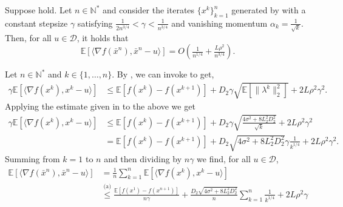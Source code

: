 \begin{lemmarep}\label{lem:frankwolfe_rate}
    Suppose  hold. Let $n\in\mathbb{N}^*$ and consider the iterates $\{x^k\}_{k=1}^n$ generated by  with a constant stepsize $\gamma$ satisfying $\tfrac{1}{2n^{3/4}}<\gamma<\tfrac{1}{n^{3/4}}$ and vanishing momentum $\alpha_k = \frac{1}{\sqrt{k}}$. Then, for all $u\in\mathcal{D}$, it holds that
    \begin{equation*}
        \mathbb{E}[\langle \nabla f(\bar{x}^n), \bar{x}^n-u\rangle] = O\left(\tfrac{1}{n^{1/4}} + \tfrac{L\rho^2}{n^{3/4}}\right).
    \end{equation*}
\end{lemmarep}
\begin{appendixproof}
    Let $n\in\mathbb{N}^*$ and $k\in\{1,\ldots,n\}$. By , we can invoke  to get,
    \begin{equation*}
        \begin{aligned}
            \gamma\mathbb{E}[\langle \nabla f(x^k),x^k-u\rangle]
                &\leq \mathbb{E}[f(x^k) - f(x^{k+1})] + D_2 \gamma \sqrt{\mathbb{E}[\| \lambda^k\|_2^2]} + 2L\rho^2\gamma^2.
        \end{aligned}
    \end{equation*}
    Applying the estimate given in  to the above we get
    \begin{equation*}
        \begin{aligned}
            \gamma\mathbb{E}[\langle \nabla f(x^k),x^k-u\rangle]
                &\leq \mathbb{E}[f(x^k) - f(x^{k+1})] + D_2 \gamma \sqrt{\frac{4\sigma^2+8L_2^2D_2^2}{\sqrt{k}}} + 2L\rho^2\gamma^2\\
                &= \mathbb{E}[f(x^k) - f(x^{k+1})] + D_2 \sqrt{4\sigma^2+8L_2^2D_2^2} \gamma \frac{1}{k^{1/4}} + 2L\rho^2\gamma^2.
        \end{aligned}
    \end{equation*}
    Summing from $k=1$ to $n$ and then dividing by $n\gamma$ we find, for all $u\in\mathcal{D}$,
    \begin{equation*}
        \begin{aligned}
            \mathbb{E}[\langle \nabla f(\bar{x}^n),\bar{x}^n-u\rangle]
                &= \frac{1}{n}\sum\limits_{k=1}^n\mathbb{E}[\langle \nabla f(x^k),x^k-u\rangle]\\
                &\stackrel{\text{(a)}}{\leq} \frac{\mathbb{E}[f(x^1) - f(x^{n+1})]}{n\gamma} + \frac{D_2\sqrt{4\sigma^2+8L_2^2D_2^2}}{n}\sum\limits_{k=1}^n\frac{1}{k^{1/4}} + 2L\rho^2\gamma\\

\end{aligned}
\end{equation*}
\end{appendixproof}

